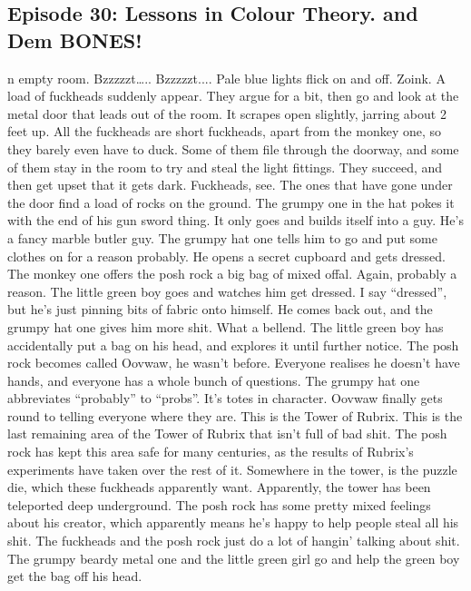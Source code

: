 \subsection{Episode 30: Lessons in Colour Theory. and Dem BONES!}
n empty room. Bzzzzzt….. Bzzzzzt....\medskip
Pale blue lights flick on and off.\medskip
Zoink.\medskip
A load of fuckheads suddenly appear. They argue for a bit, then go and look at the metal door that leads out of the room. It scrapes open slightly, jarring about 2 feet up.\medskip
All the fuckheads are short fuckheads, apart from the monkey one, so they barely even have to duck.\medskip
Some of them file through the doorway, and some of them stay in the room to try and steal the light fittings. They succeed, and then get upset that it gets dark. Fuckheads, see.\medskip
The ones that have gone under the door find a load of rocks on the ground. The grumpy one in the hat pokes it with the end of his gun sword thing. It only goes and builds itself into a guy. He’s a fancy marble butler guy.\medskip
The grumpy hat one tells him to go and put some clothes on for a reason probably. He opens a secret cupboard and gets dressed. The monkey one offers the posh rock a big bag of mixed offal. Again, probably a reason.\medskip
The little green boy goes and watches him get dressed.\medskip
I say “dressed”, but he’s just pinning bits of fabric onto himself.\medskip
He comes back out, and the grumpy hat one gives him more shit. What a bellend.\medskip
The little green boy has accidentally put a bag on his head, and explores it until further notice.\medskip
The posh rock becomes called Oovwaw, he wasn’t before. Everyone realises he doesn’t have hands, and everyone has a whole bunch of questions.\medskip
The grumpy hat one abbreviates “probably” to “probs”. It’s totes in character.\medskip
Oovwaw finally gets round to telling everyone where they are. This is the Tower of Rubrix. This is the last remaining area of the Tower of Rubrix that isn’t full of bad shit. The posh rock has kept this area safe for many centuries, as the results of Rubrix’s experiments have taken over the rest of it.\medskip
Somewhere in the tower, is the puzzle die, which these fuckheads apparently want.\medskip
Apparently, the tower has been teleported deep underground.\medskip
The posh rock has some pretty mixed feelings about his creator, which apparently means he’s happy to help people steal all his shit. The fuckheads and the posh rock just do a lot of hangin’ talking about shit.\medskip
The grumpy beardy metal one and the little green girl go and help the green boy get the bag off his head.\medskip
